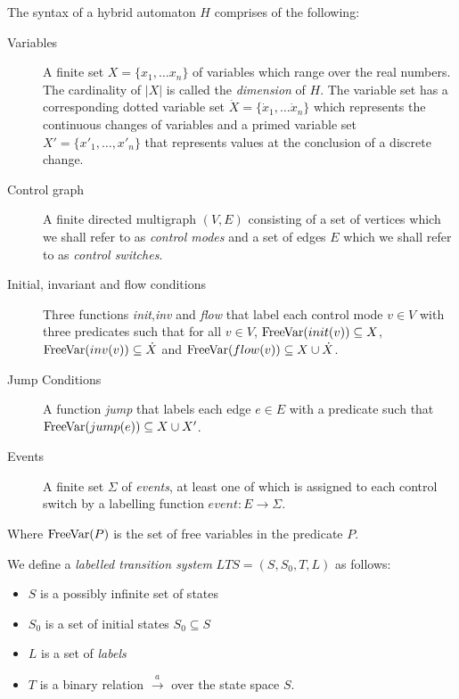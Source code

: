 \begin{mydef}
The syntax of a hybrid automaton $H$ comprises of the following:
\begin{description}
\item[Variables] A finite set $X = \{x_1, \ldots x_n \}$ of variables which range over the real numbers. The cardinality of $|X|$ is called the \emph{dimension} of $H$. The variable set has a corresponding dotted variable set $\dot{X} = \{\dot{x}_1, \ldots \dot{x}_n \}$ which represents the continuous changes of variables and a primed variable set $X' = \{x'_1, \ldots , x'_n \}$ that represents  values at the conclusion of a discrete change.

\item[Control graph] A finite directed multigraph $(V,E)$ consisting of a set of vertices which we shall refer to as \emph{control modes} and a set of edges $E$ which we shall refer to as \emph{control switches}.

\item[Initial, invariant and flow conditions] Three functions \emph{init},\emph{inv} and \emph{flow} that label each control mode $v \in V$ with three predicates such that for all $v \in V$, $\mathrm{FreeVar}(init(v)) \subseteq X$, $\mathrm{FreeVar}(inv(v)) \subseteq \dot{X}$ and $\mathrm{FreeVar}(flow(v)) \subseteq X \cup \dot{X}$. 


\item[Jump Conditions] A function \emph{jump} that labels each edge $e \in E$ with a predicate such that $\mathrm{FreeVar}(jump(e)) \subseteq X \cup X' $.

\item[Events] A finite set $\Sigma$ of \emph{events}, at least one of which is assigned to  each control switch by a labelling function $event: E \to \Sigma$.

\end{description}
Where $\mathrm{FreeVar}(P)$ is the set of free variables in the predicate $P$.
\end{mydef}


\begin{mydef}
We define a \emph{labelled transition system} $LTS = (S,S_0,T,L)$ as follows:
\begin{itemize}

\item $S$ is a possibly infinite set of states

\item $S_0$ is a set of initial states $S_0 \subseteq S$

\item $L$ is a set of \emph{labels}

\item $T$ is a binary relation $\xrightarrow{a}$ over the state space $S$.

\end{itemize}
\end{mydef}

